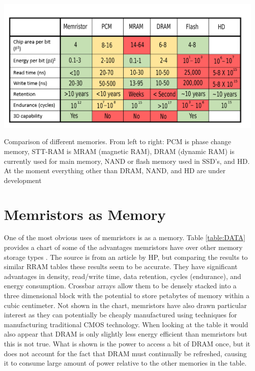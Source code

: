 \documentclass{sig-alternate}
\begin{document}
\begin{table}
  \includegraphics[width=\linewidth]{Comparison-of-Data-Storage-2updated8.pdf}
  \caption{\cite{HPmemStuff} Comparison of different memories.  From left to right: PCM is phase change memory, STT-RAM is MRAM (magnetic RAM), DRAM (dynamic RAM) is currently used for main memory, NAND or flash memory used in SSD's, and HD.  At the moment everything other than DRAM, NAND, and HD are under development}
  \label{table:DATA}
\end{table}
\label{sec:inlineEquations}



\section{Memristors as Memory}
\label{lowHangers}
One of the most obvious uses of memristors is as a memory.  Table \ref{table:DATA} provides a chart of some of the advantages memristors have over other memory storage types \cite{HPmemStuff}.  The source is from an article by HP, but comparing the results to similar RRAM tables these results seem to be accurate.  They have significant advantages in density, read/write time, data retention, cycles (endurance), and energy consumption.  Crossbar arrays allow them to be densely stacked into a three dimensional block with the potential to store petabytes of memory within a cubic centimeter.  Not shown in the chart, memristors have also drawn particular interest as they can potentially be cheaply manufactured using techniques for manufacturing traditional CMOS technology.  When looking at the table it would also appear that DRAM is only slightly less energy efficient than memristors but this is not true.  What is shown is the power to access a bit of DRAM once, but it does not account for the fact that DRAM must continually be refreshed, causing it to consume large amount of power relative to the other memories in the table.  
\end{document}
